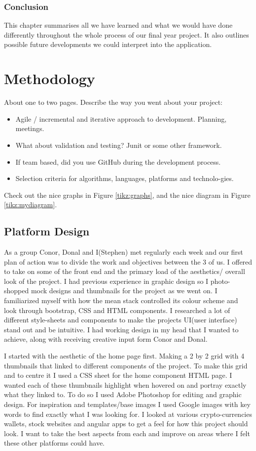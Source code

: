 \subsection{Conclusion}
This chapter summarises all we have learned and what we would have done differently throughout the whole process of our final year project. It also outlines possible future developments we could interpret into the application.



\chapter{Methodology}
About one to two pages.
Describe the way you went about your project:
\begin{itemize}
\item Agile / incremental and iterative approach to development. Planning, meetings.
\item What about validation and testing? Junit or some other framework.
\item If team based, did you use GitHub during the development process.
\item Selection criteria for algorithms, languages, platforms and technolo-gies.
\end{itemize}
Check out the nice graphs in Figure \ref{tikz:graphs}, and the nice diagram in Figure \ref{tikz:mydiagram}.

\section{Platform Design}

As a group Conor, Donal and I(Stephen) met regularly each week and our first plan of action was to divide the work and objectives between the 3 of us. I offered to take on some of the front end and the primary load of the aesthetics/ overall look of the project. I had previous experience in graphic design so I photo-shopped mock designs and thumbnails for the project as we went on. I familiarized myself with how the mean stack controlled its colour scheme and look through bootstrap, CSS and HTML components. I researched a lot of different style-sheets and components to make the projects UI(user interface) stand out and be intuitive. I had working design in my head that I wanted to achieve, along with receiving creative input form Conor and Donal.

I started with the aesthetic of the home page first. Making a 2 by 2 grid with 4 thumbnails that linked to different components of the project. To make this grid and to centre it I used a CSS sheet for the home component HTML page. I wanted each of these thumbnails highlight when hovered on and portray exactly what they linked to. To do so I used Adobe Photoshop for editing and graphic design. For inspiration and templates/base images I used Google images with key words to find exactly what I was looking for. I looked at various crypto-currencies wallets, stock websites and angular apps to get a feel for how this project should look. I want to take the best aspects from each and improve on areas where I felt these other platforms could have. 

